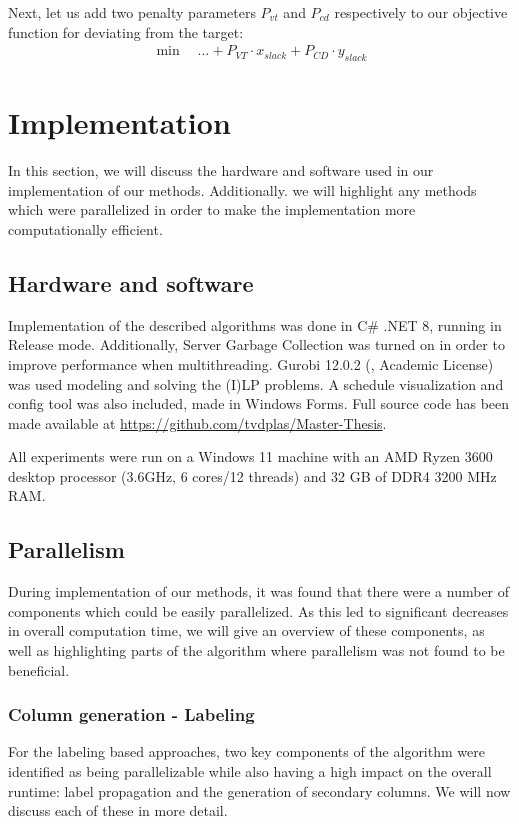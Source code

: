 \documentclass[]{article}
\begin{document}
Next, let us add two penalty parameters $P_{vt}$ and $P_{cd}$ respectively to our objective function for deviating from the target:
\begin{align}
\min \quad \dots + P_{VT} \cdot x_{slack} + P_{CD} \cdot y_{slack}
\end{align}

\section{Implementation}
In this section, we will discuss the hardware and software used in our implementation of our methods. Additionally. we will highlight any methods which were parallelized in order to make the implementation more computationally efficient. 

\subsection{Hardware and software}
Implementation of the described algorithms was done in C\# .NET 8, running in Release mode. Additionally, Server Garbage Collection was turned on in order to improve performance when multithreading. Gurobi 12.0.2 (\citet{Gurobi2025}, Academic License) was used modeling and solving the (I)LP problems. A schedule visualization and config tool was also included, made in Windows Forms. Full source code has been made available at \url{https://github.com/tvdplas/Master-Thesis}.

All experiments were run on a Windows 11 machine with an AMD Ryzen 3600 desktop processor (3.6GHz, 6 cores/12 threads) and 32 GB of DDR4 3200 MHz RAM.  

\subsection{Parallelism}
During implementation of our methods, it was found that there were a number of components which could be easily parallelized. As this led to significant decreases in overall computation time, we will give an overview of these components, as well as highlighting parts of the algorithm where parallelism was not found to be beneficial.

\subsubsection{Column generation - Labeling}
For the labeling based approaches, two key components of the algorithm were identified as being parallelizable while also having a high impact on the overall runtime: label propagation and the generation of secondary columns. We will now discuss each of these in more detail. 
\end{document}
